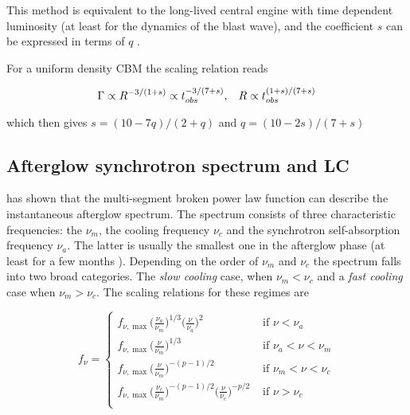 This method is equivalent to the long-lived central engine with time dependent luminosity (at least for the dynamics of the blast wave), and the coefficient $s$ can be expressed in terms of $q$ \cite{Zhang:2005fa}. 

For a uniform density \ac{CBM} the scaling relation reads

\begin{equation}
\Gamma\propto R^{-3/(1+s)}\propto t_{obs}^{-3/(7+s)}, \hspace{3mm} R\propto t_{obs}^{(1+s)/(7+s)}
\end{equation}

which then gives $s = (10-7q)/(2+q)$ and $q=(10-2s)/(7+s)$




\subsection{Afterglow synchrotron spectrum and \ac{LC}}


\cite{Sari:1997qe} has shown that the multi-segment broken power law function can  describe the instantaneous afterglow spectrum. The spectrum consists of three characteristic frequencies: the  $\nu_m$, the cooling frequency $\nu_c$ and the synchrotron self-absorption frequency $\nu_a$.
The latter is usually the smallest one in the afterglow phase (at least for a few months ).
Depending on the order of $\nu_m$ and $\nu_c$ the spectrum falls into two broad categories. The \textit{slow cooling} case, when $\nu_m < \nu_c$ and a \textit{fast cooling} case when $\nu_m > \nu_c$. The scaling relations for these regimes are \cite{Sari:1997qe}

\begin{equation}
f_{\nu} = 
\begin{cases}
f_{\nu,\max}\Big(\frac{\nu_a}{\nu_m}\Big)^{1/3}\Big(\frac{\nu}{\nu_a}\Big)^2 & \text{ if } \nu < \nu_a \\
f_{\nu,\max}\Big(\frac{\nu}{\nu_m}\Big)^{1/3} & \text{ if } \nu_a < \nu < \nu_m \\
f_{\nu,\max}\Big(\frac{\nu}{\nu_m}\Big)^{-(p-1)/2} & \text{ if } \nu_m < \nu < \nu_c \\
f_{\nu,\max}\Big(\frac{\nu_c}{\nu_m}\Big)^{-(p-1)/2}\Big(\frac{\nu}{\nu_c}\Big)^{-p/2} & \text{ if } \nu > \nu_c \\
\end{cases}
\end{equation}

